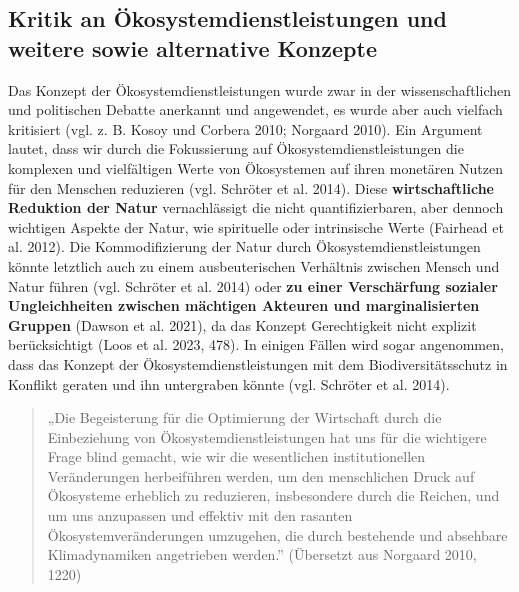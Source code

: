 \documentclass[
  nswissgerman,
  a4paper,
  DIV=11,
  numbers=noendperiod,
  oneside,
  openany]{scrreprt}
\begin{document}
\subsection{Kritik an Ökosystemdienstleistungen und weitere sowie
alternative
Konzepte}\label{kritik-an-uxf6kosystemdienstleistungen-und-weitere-sowie-alternative-konzepte}

Das Konzept der Ökosystemdienstleistungen wurde zwar in der
wissenschaftlichen und politischen Debatte anerkannt und angewendet, es
wurde aber auch vielfach kritisiert (vgl. z. B. Kosoy und Corbera 2010;
Norgaard 2010). Ein Argument lautet, dass wir durch die Fokussierung auf
Ökosystemdienstleistungen die komplexen und vielfältigen Werte von
Ökosystemen auf ihren monetären Nutzen für den Menschen reduzieren (vgl.
{Schröter et al.} 2014). Diese \textbf{wirtschaftliche Reduktion der
Natur} vernachlässigt die nicht quantifizierbaren, aber dennoch
wichtigen Aspekte der Natur, wie spirituelle oder intrinsische Werte
(Fairhead et al. 2012). Die Kommodifizierung der Natur durch
Ökosystemdienstleistungen könnte letztlich auch zu einem ausbeuterischen
Verhältnis zwischen Mensch und Natur führen (vgl. {Schröter et al.}
2014) oder \textbf{zu einer Verschärfung sozialer Ungleichheiten
zwischen mächtigen Akteuren und marginalisierten Gruppen} (Dawson et al.
2021), da das Konzept Gerechtigkeit nicht explizit berücksichtigt (Loos
et al. 2023, 478). In einigen Fällen wird sogar angenommen, dass das
Konzept der Ökosystemdienstleistungen mit dem Biodiversitätsschutz in
Konflikt geraten und ihn untergraben könnte (vgl. {Schröter et al.}
2014).

\begin{quote}
„Die Begeisterung für die Optimierung der Wirtschaft durch die
Einbeziehung von Ökosystemdienstleistungen hat uns für die wichtigere
Frage blind gemacht, wie wir die wesentlichen institutionellen
Veränderungen herbeiführen werden, um den menschlichen Druck auf
Ökosysteme erheblich zu reduzieren, insbesondere durch die Reichen, und
um uns anzupassen und effektiv mit den rasanten Ökosystemveränderungen
umzugehen, die durch bestehende und absehbare Klimadynamiken angetrieben
werden.'' (Übersetzt aus Norgaard 2010, 1220)
\end{quote}
\end{document}
